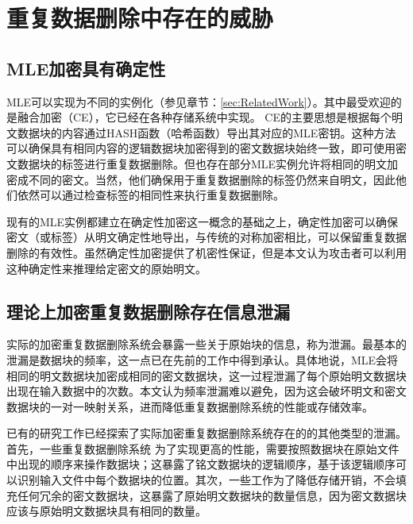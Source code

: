 \section{重复数据删除中存在的威胁}

\subsection{MLE加密具有确定性}

MLE可以实现为不同的实例化（参见章节：\ref{sec:RelatedWork}）。其中最受欢迎的是融合加密（CE），它已经在各种存储系统中实现。 CE的主要思想是根据每个明文数据块的内容通过HASH函数（哈希函数）导出其对应的MLE密钥。这种方法可以确保具有相同内容的逻辑数据块加密得到的密文数据块始终一致，即可使用密文数据块的标签进行重复数据删除。但也存在部分MLE实例允许将相同的明文加密成不同的密文。当然，他们确保用于重复数据删除的标签仍然来自明文，因此他们依然可以通过检查标签的相同性来执行重复数据删除。
 

现有的MLE实例都建立在确定性加密这一概念的基础之上，确定性加密可以确保密文（或标签）从明文确定性地导出，与传统的对称加密相比，可以保留重复数据删除的有效性。虽然确定性加密提供了机密性保证，但是本文认为攻击者可以利用这种确定性来推理给定密文的原始明文。

\subsection{理论上加密重复数据删除存在信息泄漏}

实际的加密重复数据删除系统会暴露一些关于原始块的信息，称为泄漏。最基本的泄漏是数据块的频率，这一点已在先前的工作中得到承认。具体地说，MLE会将相同的明文数据块加密成相同的密文数据块，这一过程泄漏了每个原始明文数据块出现在输入数据中的次数。本文认为频率泄漏难以避免，因为这会破坏明文和密文数据块的一对一映射关系，进而降低重复数据删除系统的性能或存储效率。

已有的研究工作已经探索了实际加密重复数据删除系统存在的的其他类型的泄漏。首先，一些重复数据删除系统   为了实现更高的性能，需要按照数据块在原始文件中出现的顺序来操作数据块；这暴露了铭文数据块的逻辑顺序，基于该逻辑顺序可以识别输入文件中每个数据块的位置。其次，一些工作为了降低存储开销，不会填充任何冗余的密文数据块，这暴露了原始明文数据块的数量信息，因为密文数据块应该与原始明文数据块具有相同的数量。

